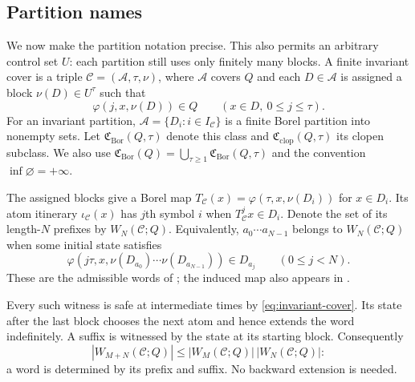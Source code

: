 \documentclass[11pt,reqno]{amsart}
\numberwithin{equation}{section}
\theoremstyle{definition}
\theoremstyle{definition}
\newcommand{\C}{\mathcal C}
\newcommand{\Bor}{\mathrm{Bor}}
\newcommand{\clop}{\mathrm{clop}}
\begin{document}
\subsection{Partition names}\label{sec:partition-names}
We now make the partition notation precise. This also permits an
arbitrary control set $U$: each partition still uses only finitely
many blocks. A finite invariant cover is a triple
$\C=(\mathcal A,\tau,\nu)$, where $\mathcal A$ covers $Q$
and each $D\in\mathcal A$ is assigned a block $\nu(D)\in U^\tau$
such that
\begin{equation}\label{eq:invariant-cover}
 \varphi(j,x,\nu(D))\in Q\qquad(x\in D,\ 0\le j\le\tau).
\end{equation}
For an invariant partition, $\mathcal A=\{D_i:i\in I_\C\}$
is a finite Borel partition into nonempty sets. Let
$\mathfrak C_{\Bor}(Q,\tau)$ denote this class and
$\mathfrak C_{\clop}(Q,\tau)$ its clopen subclass. We also use
$\mathfrak C_{\Bor}(Q)=\bigcup_{\tau\ge1}\mathfrak C_{\Bor}(Q,\tau)$
and the convention $\inf\varnothing=+\infty$.

The assigned blocks give a Borel map
$T_\C(x)=\varphi(\tau,x,\nu(D_i))$ for $x\in D_i$.
Its atom itinerary $\iota_\C(x)$ has $j$th symbol $i$ when
$T_\C^jx\in D_i$. Denote the set of its length-$N$ prefixes by
$W_N(\C;Q)$. Equivalently, $a_0\cdots a_{N-1}$ belongs to
$W_N(\C;Q)$ when some initial state satisfies
\begin{equation}\label{eq:admissible-word}
 \varphi(j\tau,x,\nu(D_{a_0})\cdots\nu(D_{a_{N-1}}))
       \in D_{a_j}\qquad(0\le j<N).
\end{equation}
These are the admissible words of
\cite[Definition~2.9]{Kawan2013}; the induced map also appears in
\cite[Section~2]{TomarKawanZamani2022}.

Every such witness is safe at intermediate times by
\eqref{eq:invariant-cover}. Its state after the last block chooses
the next atom and hence extends the word indefinitely. A suffix is
witnessed by the state at its starting block. Consequently
\begin{equation}\label{eq:word-submult}
 |W_{M+N}(\C;Q)|\le |W_M(\C;Q)|\,|W_N(\C;Q)|:
\end{equation}
a word is determined by its prefix and suffix. No backward extension
is needed.
\end{document}
